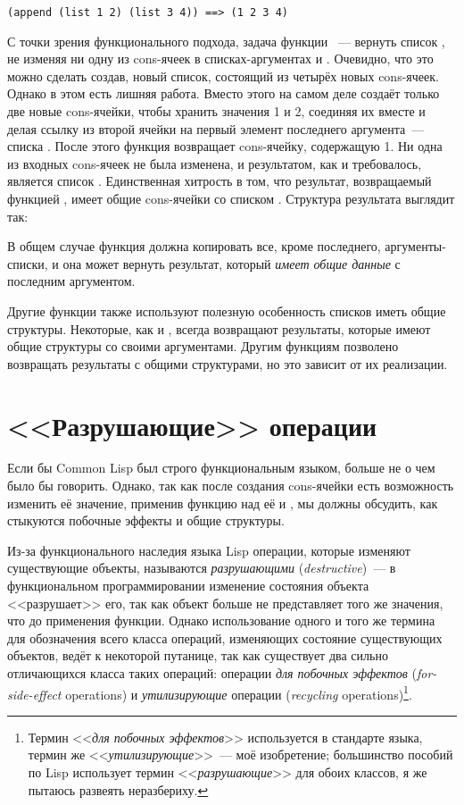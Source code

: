 \begin{lstlisting}
(append (list 1 2) (list 3 4)) ==> (1 2 3 4)
\end{lstlisting}

С точки зрения функционального подхода, задача функции ~--- вернуть список
, не изменяя ни одну из cons-ячеек в списках-аргументах  и
. Очевидно, что это можно сделать создав, новый список, состоящий из четырёх
новых cons-ячеек. Однако в этом есть лишняя работа. Вместо этого  на самом
деле создаёт только две новые cons-ячейки, чтобы хранить значения 1 и 2, соединяя их
вместе и делая ссылку из  второй ячейки на первый элемент последнего аргумента~---
списка . После этого функция возвращает cons-ячейку, содержащую 1. Ни одна из
входных cons-ячеек не была изменена, и результатом, как и требовалось, является список
. Единственная хитрость в том, что результат, возвращаемый функцией
, имеет общие cons-ячейки со списком . Структура результата
выглядит так:


В общем случае функция  должна копировать все, кроме последнего,
аргументы-списки, и она может вернуть результат, который \textit{имеет общие данные} с
последним аргументом.

Другие функции также используют полезную особенность списков иметь общие
структуры. Некоторые, как и , всегда возвращают результаты, которые имеют
общие структуры со своими аргументами. Другим функциям позволено возвращать результаты с
общими структурами, но это зависит от их реализации.

\section{<<Разрушающие>> операции}

Если бы Common Lisp был строго функциональным языком, больше не о чем было бы
говорить. Однако, так как после создания cons-ячейки есть возможность изменить её значение,
применив функцию  над её  и , мы должны обсудить, как
стыкуются побочные эффекты и общие структуры.

Из-за функционального наследия языка Lisp операции, которые изменяют существующие объекты,
называются \textit{разрушающими} (\textit{destructive})~--- в функциональном программировании
изменение состояния объекта <<разрушает>> его, так как объект больше не представляет того же
значения, что до применения функции. Однако использование одного и того же термина для
обозначения всего класса операций, изменяющих состояние существующих объектов, ведёт к некоторой
путанице, так как существует два сильно отличающихся класса таких операций:
операции \textit{для побочных эффектов} (\textit{for-side-effect} operations) и
\textit{утилизирующие} операции (\textit{recycling} operations)\footnote{Термин <<\textit{для
  побочных эффектов}>> используется в стандарте языка, термин же <<\textit{утилизирующие}>>~---
  моё изобретение; большинство пособий по Lisp использует термин <<\textit{разрушающие}>> для
  обоих классов, я же пытаюсь развеять неразбериху.}.

